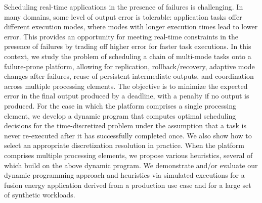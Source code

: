 Scheduling real-time applications in the presence of failures is
challenging.  In many domains, some level of output error is tolerable:
application tasks offer different execution modes, where modes with longer
execution times lead to lower error.  This provides an opportunity for
meeting real-time constraints in the presence of failures by trading off
higher error for faster task executions.  In this context, we study the
problem of scheduling a chain of multi-mode tasks onto a failure-prone
platform, allowing for replication, rollback/recovery, adaptive mode
changes after failures, reuse of persistent intermediate outputs, and
coordination across multiple processing elements. The objective is to
minimize the expected error in the final output produced by a deadline,
with a penalty if no output is produced.  For the case in which the
platform comprises a single processing element, we develop a dynamic
program that computes optimal scheduling decisions for the time-discretized
problem under the assumption that a task is never re-executed after it has
successfully completed once.  We also show how to select an appropriate
discretization resolution in practice.  When the platform comprises
multiple processing elements, we propose various heuristics, several of
which build on the above dynamic program.  We demonstrate and/or evaluate
our dynamic programming approach and heuristics via simulated executions
for a fusion energy application derived from a production use case and for
a large set of synthetic workloads.
